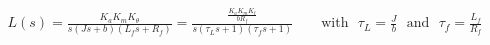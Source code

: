 \begin {align}[] L(s) = \frac {K_a K_m K_\theta }{s(J s +b)(L_f s+ R_f)} = \frac {\frac {K_aK_mK_t}{b R_f}}{s(\tau _L s + 1)(\tau _f s + 1)} \qquad \text {with~~}\tau _L=\frac {J}{b} \text {~~and~~} \tau _f = \frac {L_f}{R_f} \end {align} 
